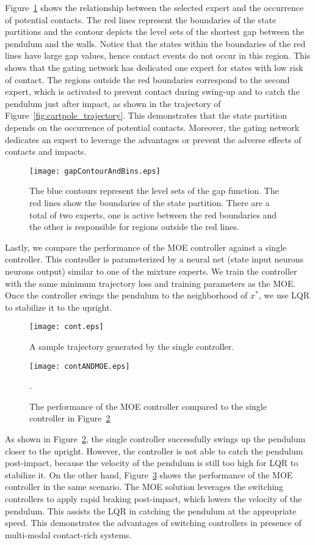 Figure~\ref{fig:gapContour} shows the relationship between the selected expert
and the occurrence of potential contacts.
%
The red lines represent the boundaries of the state partitions and the contour
depicts the level sets of the shortest gap between the pendulum and the walls.
%
Notice that the states within the boundaries of the red lines have large gap
values, hence contact events do not occur in this region.
%
This shows that the gating network has dedicated one expert for states with low
risk of contact.
%
The regions outside the red boundaries correspond to the second expert, which is
activated to prevent contact during swing-up and to catch the pendulum just
after impact, as shown in the trajectory of
Figure~\ref{fig:cartpole_trajectory}.
%
This demonstrates that the state partition depends on the occurrence of
potential contacts.
%
Moreover, the gating network dedicates an expert to leverage the
advantages or prevent the adverse effects of contacts and impacts.
%
\begin{figure}[H]
    \centering
    \texttt{[image: gapContourAndBins.eps]}
    \caption{The blue contours represent the level sets of the gap function. The red lines show the boundaries of the state partition. There are a total of two experts, one is active between the red boundaries and the other is responsible for regions outside the red lines.}
    \label{fig:gapContour}
\end{figure}

%
Lastly, we compare the performance of the MOE controller against a single controller.
%
This controller is parameterized by a neural net (state input 
neurons  neurons  output) similar to one of the
mixture experts.
%
We train the controller with the same minimum trajectory loss and training
parameters as the MOE.
%
Once the controller swings the pendulum to the neighborhood of $x^*$, we use LQR
to stabilize it to the upright.
%
\begin{figure}[tb]
    \centering
    \texttt{[image: cont.eps]}
    \caption{A sample trajectory generated by the single controller. }
    \label{fig:continuous_control}
\end{figure}
%
\begin{figure}[H]
    \centering
    \texttt{[image: contANDMOE.eps]}
    \caption{The performance of the MOE controller compared to the single
    controller in Figure~\ref{fig:continuous_control}}.
    \label{fig:contandmoe}
\end{figure}
%
\noindent As shown in Figure~\ref{fig:continuous_control}, the single controller
successfully swings up the pendulum closer to the upright.
%
However, the controller is not able to catch the pendulum post-impact, because
the velocity of the pendulum is still too high for LQR to stabilize it.
%
On the other hand, Figure~\ref{fig:contandmoe} shows the performance of the MOE
controller in the same scenario.
%
The MOE solution leverages the switching controllers to apply rapid braking
post-impact, which lowers the velocity of the pendulum. 
%
This assists the LQR in catching the pendulum at the appropriate speed.
%
This demonstrates the advantages of switching controllers in presence of
multi-modal contact-rich systems.